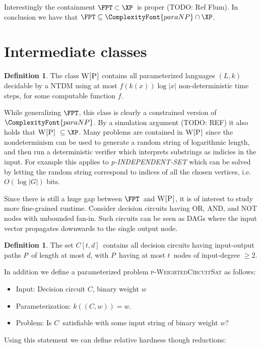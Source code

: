 \documentclass[a4paper,11pt]{report}
\theoremstyle{plain}
\theoremstyle{definition}
\newtheorem{defn}[thm]{Definition} %
\newcommand{\PARANP}{\ComplexityFont{paraNP}}
\begin{document}
Interestingly the containment $\FPT \subset \XP$ is proper (TODO: Ref Flum).
In conclusion we have that $\FPT \subseteq \PARANP \cap \XP$.

\section{Intermediate classes}

\begin{defn}
The class $\textsc{W[P]}$ contains all parameterized languages $(L, k)$ decidable by a NTDM using at most $f(k(x)) \log |x| $ non-deterministic time steps, for some computable function $f$.
\end{defn}

While generalizing $\FPT$, this class is clearly a constrained version of $\PARANP$.
By a simulation argument (TODO: REF) it also holds that $\textsc{W[P]} \subseteq \XP$.
Many problems are contained in $\textsc{W[P]}$ since the nondeterminism can be used to generate a random string of logarithmic length, and then run a deterministic verifier which
interprets substrings as indicies in the input.
For example this applies to \emph{p-INDEPENDENT-SET} which can be solved by letting the random string correspond to indices of all the chosen vertices, i.e. $O(\log |G|)$ bits.

Since there is still a huge gap between $\FPT$ and $\textsc{W[P]}$, it is of interest to study more fine-grained runtime.
Consider decision circuits having OR, AND, and NOT nodes with unbounded fan-in.
Such circuits can be seen as DAGs where the input vector propagates downwards to the single output node.

\begin{defn}
The set $C[t, d]$ contains all decision circuits having input-output paths $P$ of length at most $d$, with $P$ having at most $t$ nodes of input-degree $\ge 2$.
\end{defn}

In addition we define a parameterized problem \textsc{p-WeightedCircuitSat} as follows:
\begin{itemize}
\item Input: Decision circuit $C$, binary weight $w$
\item Parameterization: $k((C, w)) = w$.
\item Problem: Is $C$ satisfiable with some input string of binary weight $w$?
\end{itemize}

Using this statement we can define relative hardness though reductions:
\end{document}
